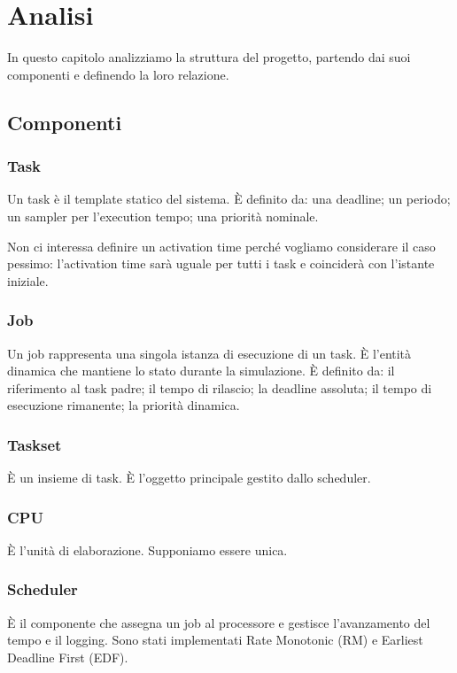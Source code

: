 \chapter{Analisi}
In questo capitolo analizziamo la struttura del progetto, partendo dai suoi componenti e definendo la loro relazione.

\section{Componenti}

\subsection{Task}
Un task è il template statico del sistema. È definito da: una deadline; un periodo; un sampler per l'execution tempo; una priorità nominale.

Non ci interessa definire un activation time perché vogliamo considerare il caso pessimo: l'activation time sarà uguale per tutti i task e coinciderà con l'istante iniziale.

\subsection{Job}
Un job rappresenta una singola istanza di esecuzione di un task. È l'entità dinamica che mantiene lo stato durante la simulazione. È definito da: il riferimento al task padre; il tempo di rilascio; la deadline assoluta; il tempo di esecuzione rimanente; la priorità dinamica.

\subsection{Taskset}
È un insieme di task. È l'oggetto principale gestito dallo scheduler.

\subsection{CPU}
È l'unità di elaborazione. Supponiamo essere unica.

\subsection{Scheduler}
È il componente che assegna un job al processore e gestisce l'avanzamento del tempo e il logging. Sono stati implementati Rate Monotonic (RM) e Earliest Deadline First (EDF).


